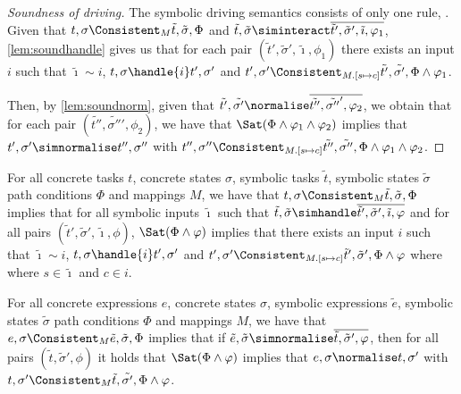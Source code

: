 \begin{proof}[Soundness of driving]
  The symbolic driving semantics consists of only one rule, .
  Given that $t,\sigma\Consistent_M\tilde{t},\tilde{\sigma},\Phi$ and $\tilde{t},\tilde{\sigma}\siminteract\overline{\tilde{t}',\tilde{\sigma}',\tilde{\imath},\phi_1}$,
  \cref{lem:soundhandle} gives us that for each pair $(\tilde{t}',\tilde{\sigma}',\tilde{\imath},\phi_1)$
  there exists an input $i$ such that $\tilde{\imath}\sim i$, $t,\sigma\handle{i}t',\sigma'$
  and $t',\sigma'\Consistent_{M.[s\mapsto c]}\tilde{t'},\tilde{\sigma'},\Phi\land\phi_1$.

  Then, by \cref{lem:soundnorm}, given that $\tilde{t'},\tilde{\sigma'}\normalise\overline{\tilde{t''},\tilde{\sigma''}',\phi_2}$,
  we obtain that for each pair $(\tilde{t''},\tilde{\sigma''}',\phi_2)$, we have that $\Sat(\Phi\land\phi_1\land\phi_2)$ implies
  that $t',\sigma'\simnormalise t'',\sigma''$ with $t'',\sigma''\Consistent_{M.[s\mapsto c]}\tilde{t''},\tilde{\sigma''},\Phi\land\phi_1\land\phi_2$.
\end{proof}


\begin{lemma}
  \label{lem:soundhandle}

  For all concrete tasks $t$, concrete states $\sigma$, symbolic tasks $\tilde{t}$, symbolic states $\tilde{\sigma}$ path conditions $\Phi$ and mappings $M$,
  we have that $t,\sigma\Consistent_{M}\tilde{t},\tilde{\sigma},\Phi$ implies
  that for all symbolic inputs $\tilde{\imath}$ such that $\tilde{t},\tilde{\sigma}\simhandle\overline{\tilde{t}',\tilde{\sigma}',\tilde{\imath},\phi}$ and
  for all pairs $(\tilde{t}',\tilde{\sigma}',\tilde{\imath},\phi)$,
  $\Sat(\Phi\land\phi)$ implies that there exists an input $i$ such that $\tilde{\imath}\sim i$,  $t,\sigma\handle{i}t',\sigma'$ and $t',\sigma'\Consistent_{M.[s\mapsto c]}\tilde{t}',\tilde{\sigma}',\Phi\land\phi$ where where $s\in\tilde{\imath}$ and $c\in i$.

\end{lemma}



\begin{lemma}
  \label{lem:soundnorm}
  For all concrete expressions $e$, concrete states $\sigma$, symbolic expressions $\tilde{e}$, symbolic states $\tilde{\sigma}$ path conditions $\Phi$ and mappings $M$,
  we have that $e,\sigma\Consistent_{M}\tilde{e},\tilde{\sigma},\Phi$ implies
  that if $\tilde{e},\tilde{\sigma}\simnormalise\overline{\tilde{t},\tilde{\sigma}',\phi}$,
  then for all pairs $(\tilde{t},\tilde{\sigma}',\phi)$ it holds that $\Sat(\Phi\land\phi)$ implies
  that $e,\sigma\normalise t,\sigma'$ with $t,\sigma'\Consistent_{M}\tilde{t},\tilde{\sigma'},\Phi\land\phi$.
\end{lemma}

